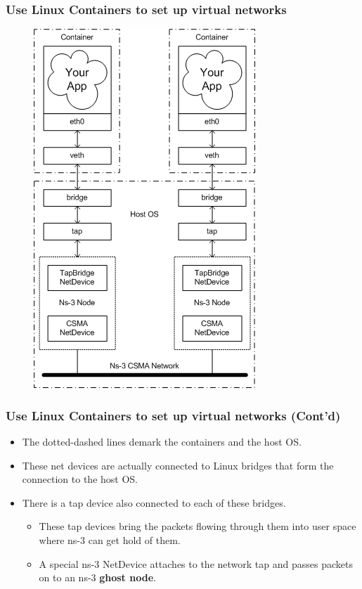 \documentclass{../iot-lecture}
\begin{document}
\begin{frame}
  \frametitle{Use Linux Containers to set up virtual networks}
  \begin{figure}
    \includegraphics[height=.8\textheight]{./img/container_and_ns3_bd.png}
  \end{figure}
\end{frame}

\begin{frame}
  \frametitle{Use Linux Containers to set up virtual networks (Cont'd)}
  \begin{itemize}
    \item The dotted-dashed lines demark the containers and the host OS\@.
    \item These net devices are actually connected to Linux bridges that form the connection to the host OS\@.
    \item  There is a tap device also connected to each of these bridges.
    \begin{itemize}
      \item These tap devices bring the packets flowing through them into user space where ns-3 can get hold of them.
      \item A special ns-3 NetDevice attaches to the network tap and passes packets on to an ns-3 \textbf{ghost node}.
    \end{itemize}
  \end{itemize}
\end{frame}
\end{document}
